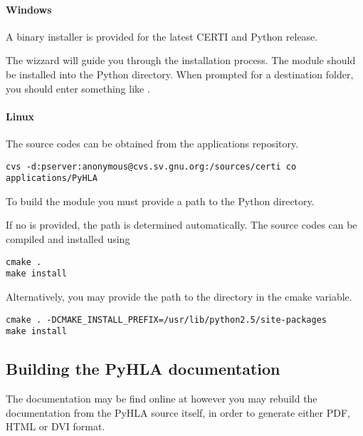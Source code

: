 \documentclass[12pt,a4paper]{howto}
\begin{document}
\paragraph{Windows}

A binary installer is provided for the latest CERTI and Python release.

The wizzard will guide you through the installation process. The 
module should be installed into the Python  directory.
When prompted for a destination folder, you should enter something like
.

\paragraph{Linux}

The  source codes can be obtained from the 
applications repository.
\begin{verbatim}
cvs -d:pserver:anonymous@cvs.sv.gnu.org:/sources/certi co applications/PyHLA
\end{verbatim}

To build the  module you must provide a path to the Python
 directory.

If no  is provided, the path is determined
automatically. The source codes can be compiled and installed using
\begin{verbatim}
cmake .
make install
\end{verbatim}

Alternatively, you may provide the path to the  directory
in the  cmake variable.
\begin{verbatim}
cmake . -DCMAKE_INSTALL_PREFIX=/usr/lib/python2.5/site-packages
make install
\end{verbatim}

\subsection{Building the PyHLA documentation}
The  documentation may be find online at
however you may rebuild the documentation from the PyHLA source itself, in order
to generate either PDF, HTML or DVI format.
\end{document}
